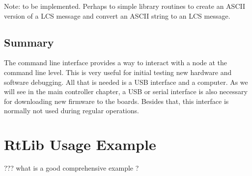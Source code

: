 Note: to be implemented. Perhaps to simple library routines to create an ASCII version of a LCS message and convert an ASCII string to an LCS message.

\section{Summary}

The command line interface provides a way to interact with a node at the command line level. This is very useful for initial testing new hardware and software debugging. All that is needed is a USB interface and a computer. As we will see in the main controller chapter, a USB or serial interface is also necessary for downloading new firmware to the boards. Besides that, this interface is normally not used during regular operations.

\chapter{ RtLib Usage Example}

??? what is a good comprehensive example ?

